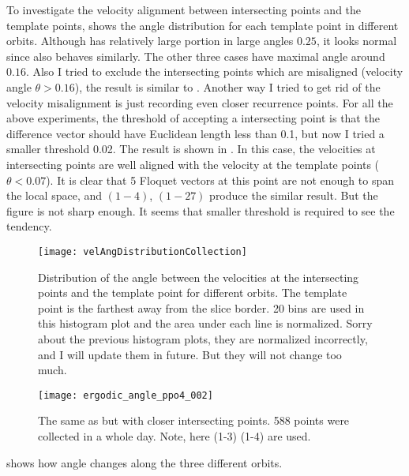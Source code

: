 \begin{description}
To investigate the velocity alignment between {\Poincare} intersecting points and
the template
points,  shows the angle distribution
for each template point in different orbits. Although  has relatively large
portion in large angles $0.25$, it looks normal since  also
behaves similarly. The other three cases have maximal angle around $0.16$. Also I tried
to exclude the intersecting points which are misaligned (velocity angle $\theta > 0.16$),
the result is similar to . Another way I tried to get rid
of the velocity misalignment is just recording even closer recurrence points. For all the
above experiments, the threshold of accepting a {\Poincare} intersecting point is that
the difference vector should have Euclidean length less than 0.1, but now I tried a
smaller threshold 0.02. The result is shown in .
In this case, the velocities at {\Poincare} intersecting points are well aligned with
the velocity at the template points ($\theta < 0.07$). It is clear that 5 Floquet vectors
at this point are not enough to span the local space, and $(1-4)$, $(1-27)$ produce the
similar result.  But the figure is not sharp enough. It seems that smaller threshold is
required to see the tendency.

\begin{figure}[h]
  \centering
  \texttt{[image: velAngDistributionCollection]}
  \caption{ Distribution of the angle between the velocities at the {\Poincare} intersecting
    points and the template point for different orbits. The template point is the farthest
    away from the slice border. 20 bins are used in this histogram plot and the area under
    each line is normalized. Sorry about the previous histogram plots, they are normalized
    incorrectly, and I will update them in future. But they will not change too much.
    }
  \label{fig:velAngDistributionCollection}
\end{figure}

\begin{figure}[h]
  \centering
  \texttt{[image: ergodic\_angle\_ppo4\_002]}
  \caption{The same as  but with closer
    intersecting points. 588 points were collected in a whole day. Note, here
    (1-3) (1-4) are used.
    }
  \label{fig:ergodic_angle_ppo4_002}
\end{figure}

 shows how angle changes along the
three different orbits.


\end{description}
